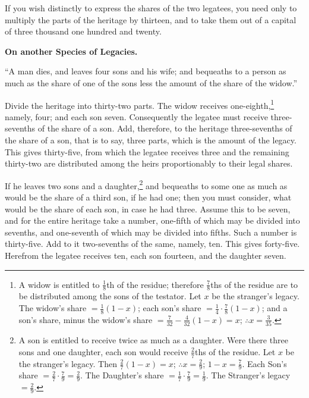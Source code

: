 If you wish distinctly to express the shares of the two legatees, you need only to multiply the parts of the heritage by thirteen, and to take them out of a capital of three thousand one hundred and twenty.

\vspace{0.3cm}
\noindent\textbf{On another Species of Legacies.}

``A man dies, and leaves four sons and his wife; and bequeaths to a person as much as the share of one of the sons less the amount of the share of the widow.''

Divide the heritage into thirty-two parts. The widow receives one-eighth,\footnote{A widow is entitled to $\frac{1}{8}$th of the residue; therefore $\frac{7}{8}$ths of the residue are to be distributed among the sons of the testator. Let $x$ be the stranger's legacy. The widow's share $= \frac{1}{8}(1-x)$; each son's share $= \frac{1}{4} \cdot \frac{7}{8}(1-x)$; and a son's share, minus the widow's share $= \frac{7}{32} - \frac{4}{32}(1-x) = x$; $\therefore x = \frac{3}{35}$.} namely, four; and each son seven. Consequently the legatee must receive three-sevenths of the share of a son. Add, therefore, to the heritage three-sevenths of the share of a son, that is to say, three parts, which is the amount of the legacy. This gives thirty-five, from which the legatee receives three and the remaining thirty-two are distributed among the heirs proportionably to their legal shares.

If he leaves two sons and a daughter,\footnote{A son is entitled to receive twice as much as a daughter. Were there three sons and one daughter, each son would receive $\frac{2}{7}$ths of the residue. Let $x$ be the stranger's legacy. Then $\frac{2}{7}(1-x) = x$; $\therefore x = \frac{2}{9}$; $1-x = \frac{7}{9}$. Each Son's share $= \frac{2}{7} \cdot \frac{7}{9} = \frac{2}{9}$. The Daughter's share $= \frac{1}{7} \cdot \frac{7}{9} = \frac{1}{9}$. The Stranger's legacy $= \frac{2}{9}$.} and bequeaths to some one as much as would be the share of a third son, if he had one; then you must consider, what would be the share of each son, in case he had three. Assume this to be seven, and for the entire heritage take a number, one-fifth of which may be divided into sevenths, and one-seventh of which may be divided into fifths. Such a number is thirty-five. Add to it two-sevenths of the same, namely, ten. This gives forty-five. Herefrom the legatee receives ten, each son fourteen, and the daughter seven.

